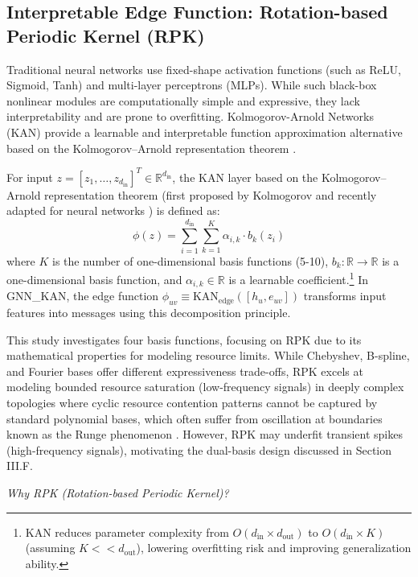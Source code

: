 \documentclass[conference]{IEEEtran}
\begin{document}
\subsection{Interpretable Edge Function: Rotation-based Periodic Kernel (RPK)}

Traditional neural networks use fixed-shape activation functions (such as ReLU, Sigmoid, Tanh) and multi-layer perceptrons (MLPs). While such black-box nonlinear modules are computationally simple and expressive, they lack interpretability and are prone to overfitting. Kolmogorov-Arnold Networks (KAN) provide a learnable and interpretable function approximation alternative based on the Kolmogorov--Arnold representation theorem \cite{kolmogorov1957,kan2024}.

For input $z = [z_1, \ldots, z_{d_{\text{in}}}]^T \in \mathbb{R}^{d_{\text{in}}}$, the KAN layer based on the Kolmogorov--Arnold representation theorem (first proposed by Kolmogorov \cite{kolmogorov1957} and recently adapted for neural networks \cite{kan2024}) is defined as:
\begin{equation}
\phi(z) = \sum_{i=1}^{d_{\text{in}}} \sum_{k=1}^{K} \alpha_{i,k} \cdot b_k(z_i)
\label{eq:kan}
\end{equation}
where $K$ is the number of one-dimensional basis functions (5-10), $b_k: \mathbb{R} \to \mathbb{R}$ is a one-dimensional basis function, and $\alpha_{i,k} \in \mathbb{R}$ is a learnable coefficient.\footnote{KAN reduces parameter complexity from $O(d_{\text{in}} \times d_{\text{out}})$ to $O(d_{\text{in}} \times K)$ (assuming $K << d_{\text{out}}$), lowering overfitting risk and improving generalization ability.} In GNN\_KAN, the edge function $\phi_{uv} \equiv \text{KAN}_{\text{edge}}([h_u, e_{uv}])$ transforms input features into messages using this decomposition principle.

This study investigates four basis functions, focusing on RPK due to its mathematical properties for modeling resource limits. While Chebyshev, B-spline, and Fourier bases offer different expressiveness trade-offs, RPK excels at modeling bounded resource saturation (low-frequency signals) in deeply complex topologies where cyclic resource contention patterns cannot be captured by standard polynomial bases, which often suffer from oscillation at boundaries known as the Runge phenomenon \cite{runge1901uber}. However, RPK may underfit transient spikes (high-frequency signals), motivating the dual-basis design discussed in Section III.F.

\textit{Why RPK (Rotation-based Periodic Kernel)?} 
\end{document}
